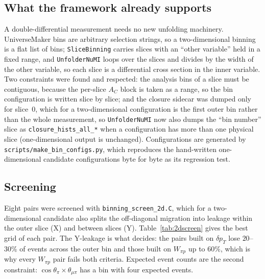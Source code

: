\subsection{What the framework already supports}

A double-differential measurement needs no new unfolding machinery. UniverseMaker bins are arbitrary
selection strings, so a two-dimensional binning is a flat list of bins; \texttt{SliceBinning} carries
slices with an ``other variable'' held in a fixed range, and \texttt{UnfolderNuMI} loops over the
slices and divides by the width of the other variable, so each slice is a differential cross section
in the inner variable. Two constraints were found and respected: the analysis bins of a slice must be
contiguous, because the per-slice $A_C$ block is taken as a range, so the bin configuration is written
slice by slice; and the closure sidecar was dumped only for slice~0, which for a two-dimensional
configuration is the first outer bin rather than the whole measurement, so \texttt{UnfolderNuMI} now
also dumps the ``bin number'' slice as \texttt{closure\_hists\_all\_*} when a configuration has more
than one physical slice (one-dimensional output is unchanged). Configurations are generated by
\texttt{scripts/make\_bin\_configs.py}, which reproduces the hand-written one-dimensional candidate
configurations byte for byte as its regression test.

\subsection{Screening}

Eight pairs were screened with \texttt{binning\_screen\_2d.C}, which for a two-dimensional candidate
also splits the off-diagonal migration into leakage within the outer slice (X) and between slices (Y).
Table~\ref{tab:2dscreen} gives the best grid of each pair. The Y-leakage is what decides: the pairs
built on $\delta p_T$ lose $20$--$30\%$ of events across the outer bin and those built on $W_{\pi p}$
up to $60\%$, which is why every $W_{\pi p}$ pair fails both criteria. Expected event counts are the
second constraint: $\cos\theta_\pi\times\theta_{\mu\pi}$ has a bin with four expected events.

